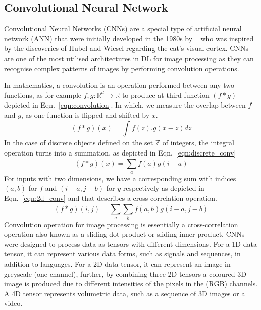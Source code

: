 \subsection{Convolutional Neural Network} 
Convolutional Neural Networks (CNNs) are a special type of artificial neural network (ANN) that were initially developed in the 1980s by ~\textcite{Fukushima1980} who was inspired by the discoveries of Hubel and Wiesel regarding the cat's visual cortex. 
CNNs are one of the most utilised architectures in DL for image processing as they can recognise complex patterns of images by performing convolution operations.

In mathematics, a convolution is an operation performed between any two functions, as for example \(f, g:\mathbb{R}^{d} \to \mathbb{R}\) to produce at third function \((f\ast g)\) depicted in Eqn.~\ref{eqn:convolution}.
In which, we measure the overlap between \(f\) and \(g\), as one function is flipped and shifted by \(x\).
\begin{equation}
	(f\ast g)(x) = \int_{}^{} f(z).g(x-z)dz
	\label{eqn:convolution}
\end{equation}
In the case of discrete objects defined on the set \(\mathbb{Z}\) of integers, the integral operation turns into a summation,  as depicted in Eqn.~\ref{eqn:discrete_conv}
\begin{equation}		
	(f\ast g)(x) = \sum_{a}^{} f(a)g(i-a)
	\label{eqn:discrete_conv}
\end{equation}
For inputs with two dimensions, we have a corresponding sum with indices \((a,b)\) for \(f\) and \((i-a, j-b)\) for \(y\) respectively as depicted in Eqn.~\ref{eqn:2d_conv} and that describes a cross correlation operation.
\begin{equation}
	(f\ast g)(i,j) = \sum_{a}^{}\sum_{b}^{}f(a,b)g(i-a,j-b)
	\label{eqn:2d_conv}
\end{equation}
Convolution operation for image processing is essentially a cross-correlation operation also known as a sliding dot product or sliding inner-product. 
CNNs were designed to process data as tensors with different dimensions. 
For a 1D data tensor, it can represent various data forms, such as signals and sequences, in addition to languages.
For a 2D data tensor, it can represent an image in greyscale (one channel), further, by combining three 2D tensors a coloured 3D image is produced due to different intensities of the pixels in the (RGB) channels.
A 4D tensor represents volumetric data, such as a sequence of 3D images or a video.

